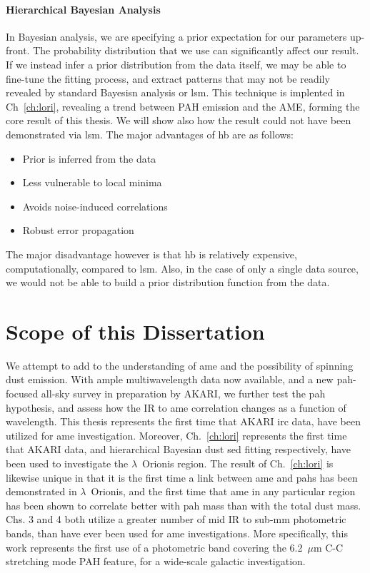         \paragraph{Hierarchical Bayesian Analysis}
        In Bayesian analysis, we are specifying a prior expectation for our parameters up-front. The probability distribution that we use can significantly affect our result. If we instead infer a prior distribution from the data itself, we may be able to fine-tune the fitting process, and extract patterns that may not be readily revealed by standard Bayesisn analysis or \acrshort{lsm}. This technique is implented in Ch~\ref{ch:lori}, revealing a trend between PAH emission and the AME, forming the core result of this thesis. We will show also how the result could not have been demonstrated via \acrshort{lsm}. The major advantages of \acrshort{hb} are as follows:
            \begin{itemize}
                \item Prior is inferred from the data
                \item Less vulnerable to local minima
                \item Avoids noise-induced correlations
                \item Robust error propagation
            \end{itemize}
        The major disadvantage however is that \acrshort{hb} is relatively expensive, computationally, compared to \acrshort{lsm}. Also, in the case of only a single data source, we would not be able to build a prior distribution function from the data.

\section{Scope of this Dissertation}
    We attempt to add to the understanding of \acrshort{ame} and the possibility of spinning dust emission. With ample multiwavelength data now available, and a new \acrshort{pah}-focused all-sky survey in preparation by AKARI, we further test the \acrshort{pah} hypothesis, and assess how the IR to \acrshort{ame} correlation changes as a function of wavelength. This thesis represents the first time that AKARI \acrshort{irc} data, have been utilized for \acrshort{ame} investigation. Moreover, Ch.~\ref{ch:lori} represents the first time that AKARI data, and hierarchical Bayesian dust \acrshort{sed} fitting respectively, have been used to investigate the $\lambda$~Orionis region. The result of Ch.~\ref{ch:lori} is likewise unique in that it is the first time a link between \acrshort{ame} and \acrshort{pah}s has been demonstrated in $\lambda$~Orionis, and the first time that \acrshort{ame} in any particular region has been shown to correlate better with \acrshort{pah} mass than with the total dust mass. Chs. 3 and 4 both utilize a greater number of mid IR to sub-mm photometric bands, than have ever been used for \acrshort{ame} investigations. More specifically, this work represents the first use of a  photometric band covering the 6.2~$\mu$m C-C stretching mode PAH feature, for a wide-scale galactic investigation.

